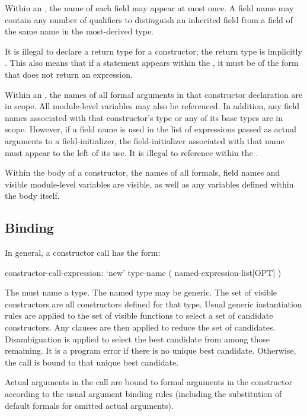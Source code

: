 Within an , the name of each field may appear at most
once.  A field name may contain any number of  qualifiers to distinguish an
inherited field from a field of the same name in the most-derived type.

It is illegal to declare a return type for a constructor; the return type is
implicitly .  This also means that if a  statement
appears within the , it must be of the form that does not
return an expression.

Within an , the names of all formal arguments in that constructor
declaration are in scope.  All module-level variables may also be referenced.  In
addition, any field names associated with that constructor's type or any of its base types
are in scope.  However, if a field name is used in the list of expressions passed as
actual arguments to a field-initializer, the field-initializer associated with that name
must appear to the left of its use.  It is illegal to reference  within the
.

Within the body of a constructor, the names of all formals, field names and visible
module-level variables are visible, as well as any variables defined within the body
itself.


\subsection{Binding}

In general, a constructor call has the form:
\begin{syntax}
constructor-call-expression:
  `new' type-name ( named-expression-list[OPT] )
\end{syntax}
The  must name a type.  The named type may be generic.
The set of visible constructors are all constructors defined for that type.  Usual
generic instantiation rules are applied to the set of visible functions to select a set of
candidate constructors.  Any  clauses are then applied to reduce the set of
candidates.  Disambiguation is applied to select the best candidate from among those
remaining.  It is a program error if there is no unique best candidate.  Otherwise, the
call is bound to that unique best candidate.

Actual arguments in the call are bound to formal arguments in the constructor according to
the usual argument binding rules (including the substitution of default formals for
omitted actual arguments).

